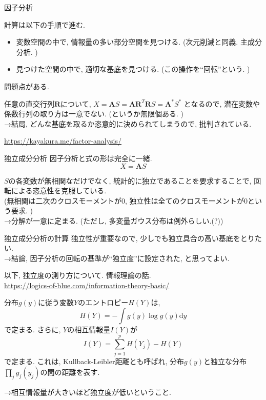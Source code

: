 \documentclass[dvipdfmx,8pt]{beamer}
\begin{document}
  \begin{frame}{因子分析}

    計算は以下の手順で進む.
    \begin{itemize}
      \item 変数空間の中で, 情報量の多い部分空間を見つける. (次元削減と同義. 主成分分析. )
      \item 見つけた空間の中で, 適切な基底を見つける. (この操作を``回転''という. )
    \end{itemize}

    問題点がある.

    任意の直交行列$\textbf{R}$について,
    $X=\textbf{A}S=\textbf{A}\textbf{R}^T\textbf{R}S=\textbf{A}^*S^*$
    となるので, 潜在変数や係数行列の取り方は一意でない. (というか無限個ある. )\\
    →結局, どんな基底を取るか恣意的に決められてしまうので, 批判されている.

    \url{https://kayakura.me/factor-analysis/}
  \end{frame}
  \begin{frame}{独立成分分析}
    因子分析と式の形は完全に一緒.
    \[
      X=\textbf{A}S
    \]

    $S$の各変数が無相関なだけでなく, 統計的に独立であることを要求することで, 回転による恣意性を克服している. \\
    (無相関は二次のクロスモーメントが0, 独立性は全てのクロスモーメントが0という要求. )\\
    →分解が一意に定まる. (ただし, 多変量ガウス分布は例外らしい.(?))
  \end{frame}
  \begin{frame}{独立成分分析の計算}
    独立性が重要なので, 少しでも独立具合の高い基底をとりたい. \\
    →結論, 因子分析の回転の基準が``独立度''に設定された, と思ってよい.

    以下, 独立度の測り方について.
    情報理論の話.\\
    \url{https://logics-of-blue.com/information-theory-basic/}

    分布$g(y)$に従う変数$Y$のエントロピー$H(Y)$は,
    \[
      H(Y)=-\int g(y)\log g(y)\mathrm{d}y
    \]
    で定まる. さらに, $Y$の相互情報量$I(Y)$が
    \[
      I(Y)=\sum_{j=1}^pH(Y_j)-H(Y)
    \]
    で定まる. これは, Kullback-Leibler距離とも呼ばれ,
    分布$g(y)$と独立な分布$\prod_jg_j(y_j)$の間の距離を表す.

    →相互情報量が大きいほど独立度が低いということ.

  \end{frame}
\end{document}
